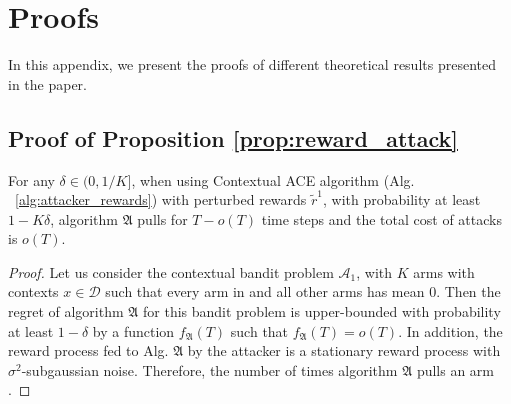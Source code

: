 
\section{Proofs}
In this appendix, we present the proofs of different theoretical results presented in the paper.
\subsection{Proof of Proposition \ref{prop:reward_attack}}\label{app:proof_prop_rewd_attack}

\begin{prop*}
	For any $\delta\in(0, 1/K]$, when using Contextual ACE algorithm (Alg. ~\ref{alg:attacker_rewards}) with perturbed rewards $\tilde{r}^{1}$, with probability at least $1-K\delta$, algorithm $\mathfrak{A}$ pulls  for $T - o(T)$ time steps and the total cost of attacks is $o(T)$.
\end{prop*}

\begin{proof}
	Let us consider the contextual bandit problem $\mathcal{A}_{1}$, with $K$ arms with contexts $x\in \mathcal{D}$ such that every arm in  and all other arms has mean $0$. Then the regret of algorithm $\mathfrak{A}$ for this bandit problem is upper-bounded with probability at least $1 - \delta$ by a function $f_{\mathfrak{A}}(T)$ such that $f_{\mathfrak{A}}(T) = o(T)$. In addition, the reward process fed to Alg. $\mathfrak{A}$ by the attacker is a stationary reward process with $\sigma^{2}$-subgaussian noise. Therefore, the number of times algorithm $\mathfrak{A}$ pulls an arm . 

\end{proof}

